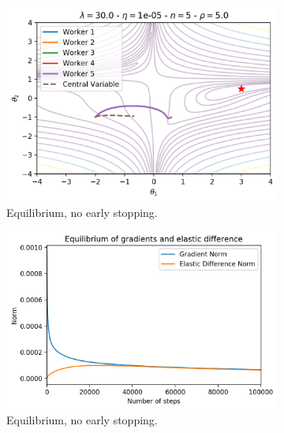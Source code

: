 \begin{figure}
  \centering
  \begin{subfigure}{.49\textwidth}
    \centering
    \includegraphics[width=\linewidth]{resources/images/easgd_sync_norm_space.png}
    \caption{Equilibrium, no early stopping.}
  \end{subfigure}
  \begin{subfigure}{.49\textwidth}
    \centering
    \includegraphics[width=\linewidth]{resources/images/easgd_sync_norm_equilibrium.png}
    \caption{Equilibrium, no early stopping.}
  \end{subfigure}
  \begin{subfigure}{.49\textwidth}
    \centering

\end{subfigure}
\end{figure}
